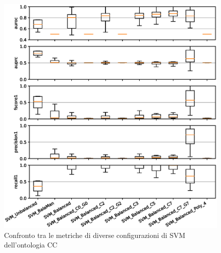 \documentclass[12pt,a4paper,oneside,hidelinks]{report}
\begin{document}
\vspace*{\fill}

\vspace*{\fill}

\begin{figure}[hb]%
    \centering
    \includegraphics[scale = 0.80]{CC-SVM-level1.eps}%
    \caption{Confronto tra le metriche di diverse configurazioni di SVM dell'ontologia CC}%
    \label{figure:liv1.2}%
\end{figure}

\vspace*{\fill}


\vspace*{\fill}
\end{document}
